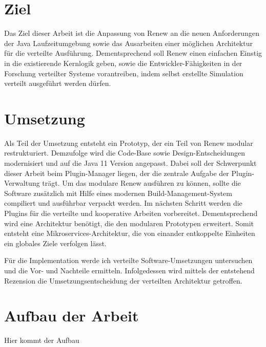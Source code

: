 \section{Ziel} \label{sec:Z}

Das Ziel dieser Arbeit ist die Anpassung von Renew an die neuen Anforderungen der Java Laufzeitumgebung sowie das Ausarbeiten einer möglichen Architektur für die verteilte Ausführung. Dementsprechend soll Renew einen einfachen Einstig in die existierende Kernlogik geben, sowie die Entwickler-Fähigkeiten in der Forschung verteilter Systeme vorantreiben, indem  selbst erstellte Simulation verteilt ausgeführt werden dürfen.


\section{Umsetzung} \label{sec:U}

Als Teil der Umsetzung entsteht ein Prototyp, der ein Teil von Renew modular restrukturiert. Demzufolge wird die Code-Base sowie Design-Entscheidungen modernisiert und auf die Java 11 Version angepasst. Dabei soll der Schwerpunkt dieser Arbeit beim Plugin-Manager liegen, der die zentrale Aufgabe der Plugin-Verwaltung trägt. Um das modulare Renew ausführen zu können, sollte die Software zusätzlich mit Hilfe eines modernen Build-Management-System compiliert und ausführbar verpackt werden. Im nächsten Schritt werden die Plugins für die verteilte und kooperative Arbeiten vorbereitet. Dementsprechend wird eine Architektur benötigt, die den modularen Prototypen erweitert. Somit entsteht eine Mikroservices-Architektur, die von einander entkoppelte Einheiten ein globales Ziele verfolgen lässt.


Für die Implementation werde ich verteilte Software-Umsetzungen untersuchen und die Vor- und Nachteile ermitteln.
Infolgedessen wird mittels der entstehend Rezension die Umsetzungsentscheidung der verteilten Architektur getroffen.



\section{Aufbau der Arbeit} \label{sec:AdA}
Hier kommt der Aufbau 

